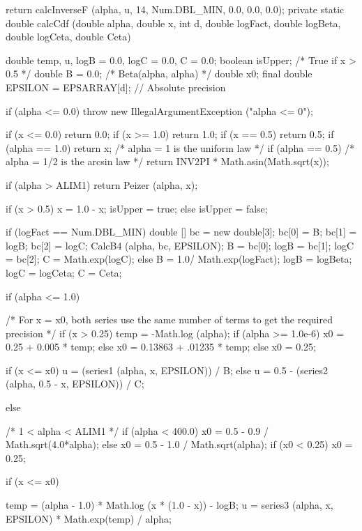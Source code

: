 \begin{code}
\begin{hide} {
      return calcInverseF (alpha, u, 14, Num.DBL_MIN, 0.0, 0.0, 0.0);
   }
   private static double calcCdf (double alpha, double x, int d,
           double logFact, double logBeta, double logCeta, double Ceta) {
      double temp, u, logB = 0.0, logC = 0.0, C = 0.0;
      boolean isUpper;                   /* True if x > 0.5 */
      double B = 0.0;                    /* Beta(alpha, alpha) */
      double x0;
      final double EPSILON = EPSARRAY[d];  // Absolute precision

      if (alpha <= 0.0)
         throw new IllegalArgumentException ("alpha <= 0");

      if (x <= 0.0) return 0.0;
      if (x >= 1.0) return 1.0;
      if (x == 0.5) return 0.5;
      if (alpha == 1.0) return x;         /* alpha = 1 is the uniform law */
      if (alpha == 0.5)                   /* alpha = 1/2 is the arcsin law */
         return INV2PI * Math.asin(Math.sqrt(x));

      if (alpha > ALIM1)
         return Peizer (alpha, x);

      if (x > 0.5) {
         x = 1.0 - x;
         isUpper = true;
      } else
         isUpper = false;

      if (logFact == Num.DBL_MIN) {
         double [] bc = new double[3];
         bc[0] = B; bc[1] = logB; bc[2] = logC;
         CalcB4 (alpha, bc, EPSILON);
         B = bc[0]; logB = bc[1]; logC = bc[2];
 	 C = Math.exp(logC);
     } else {
         B = 1.0/ Math.exp(logFact);
         logB = logBeta;
         logC = logCeta;
         C = Ceta;
      }

      if (alpha <= 1.0) {
         /* For x = x0, both series use the same number of terms to get the
            required precision */
         if (x > 0.25) {
            temp = -Math.log (alpha);
            if (alpha >= 1.0e-6)
               x0 = 0.25 + 0.005 * temp;
            else
               x0 = 0.13863 + .01235 * temp;
         } else
           x0 = 0.25;

         if (x <= x0)
            u = (series1 (alpha, x, EPSILON)) / B;
         else
            u = 0.5 - (series2 (alpha, 0.5 - x, EPSILON)) / C;

      } else {                        /* 1 < alpha < ALIM1 */
         if (alpha < 400.0)
            x0 = 0.5 - 0.9 / Math.sqrt(4.0*alpha);
         else
            x0 = 0.5 - 1.0 / Math.sqrt(alpha);
         if (x0 < 0.25)
            x0 = 0.25;

         if (x <= x0) {
            temp = (alpha - 1.0) * Math.log (x * (1.0 - x))  - logB;
            u = series3 (alpha, x, EPSILON) * Math.exp(temp) / alpha;

}}}
\end{hide}
\end{code}
